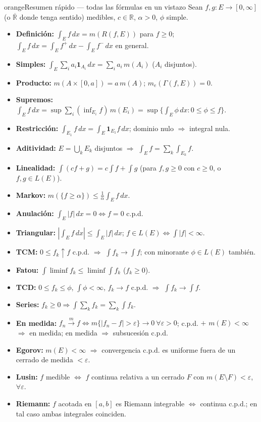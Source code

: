 \documentclass[11pt,twoside]{article}
\newcommand{\R}{\mathbb{R}}
\newcommand{\ind}{\mathbf{1}}
\begin{document}
\begin{equivbox}{orange}{Resumen rápido --- todas las fórmulas en un vistazo}
Sean $f, g : E \to [0,\infty]$ (o $\overline{\R}$ donde tenga sentido) medibles, $c \in \R$, $\alpha > 0$, $\phi$ simple.
\begin{itemize}[leftmargin=2em]
\item \textbf{Definición:} $\int_{E} f \, dx = m(R(f,E))$ para $f \geq 0$; $\int_{E} f \, dx = \int_{E} f^{+} \, dx - \int_{E} f^{-} \, dx$ en general.
\item \textbf{Simples:} $\int_{E} \sum_{i} a_{i} \ind_{A_{i}} \, dx = \sum_{i} a_{i}\, m(A_{i})$ ($A_{i}$ disjuntos).
\item \textbf{Producto:} $m(A \times [0,a]) = a\, m(A)$; $m_{e}(\Gamma(f,E)) = 0$.
\item \textbf{Supremos:} $\int_{E} f \, dx = \sup \sum_{i} (\inf_{E_{i}} f)\, m(E_{i}) = \sup \{ \int_{E} \phi \, dx : 0 \leq \phi \leq f \}$.
\item \textbf{Restricción:} $\int_{E_{1}} f \, dx = \int_{E} \ind_{E_{1}} f \, dx$; dominio nulo $\Rightarrow$ integral nula.
\item \textbf{Aditividad:} $E = \bigcup_{k} E_{k}$ disjuntos $\Rightarrow$ $\int_{E} f = \sum_{k} \int_{E_{k}} f$.
\item \textbf{Linealidad:} $\int (cf + g) = c \int f + \int g$ (para $f, g \geq 0$ con $c \geq 0$, o $f, g \in L(E)$).
\item \textbf{Markov:} $m(\{f \geq \alpha\}) \leq \frac{1}{\alpha} \int_{E} f \, dx$.
\item \textbf{Anulación:} $\int_{E} |f| \, dx = 0 \iff f = 0$ c.p.d.
\item \textbf{Triangular:} $|\int_{E} f \, dx| \leq \int_{E} |f| \, dx$; $f \in L(E) \iff \int |f| < \infty$.
\item \textbf{TCM:} $0 \leq f_{k} \uparrow f$ c.p.d. $\Rightarrow$ $\int f_{k} \to \int f$; con minorante $\phi \in L(E)$ también.
\item \textbf{Fatou:} $\int \liminf f_{k} \leq \liminf \int f_{k}$ ($f_{k} \geq 0$).
\item \textbf{TCD:} $0 \leq f_{k} \leq \phi$, $\int \phi < \infty$, $f_{k} \to f$ c.p.d. $\Rightarrow$ $\int f_{k} \to \int f$.
\item \textbf{Series:} $f_{k} \geq 0 \Rightarrow \int \sum_{k} f_{k} = \sum_{k} \int f_{k}$.
\item \textbf{En medida:} $f_{n} \xrightarrow{m} f \iff m\{|f_{n} - f| > \varepsilon\} \to 0\ \forall \varepsilon > 0$; c.p.d. $+$ $m(E) < \infty$ $\Rightarrow$ en medida; en medida $\Rightarrow$ subsucesión c.p.d.
\item \textbf{Egorov:} $m(E) < \infty$ $\Rightarrow$ convergencia c.p.d. es uniforme fuera de un cerrado de medida $< \varepsilon$.
\item \textbf{Lusin:} $f$ medible $\iff$ $f$ continua relativa a un cerrado $F$ con $m(E \setminus F) < \varepsilon$, $\forall \varepsilon$.
\item \textbf{Riemann:} $f$ acotada en $[a,b]$ es Riemann integrable $\iff$ continua c.p.d.; en tal caso ambas integrales coinciden.
\end{itemize}
\end{equivbox}
\end{document}
